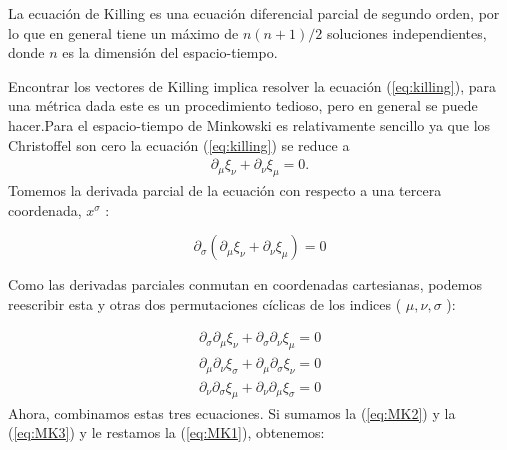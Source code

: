 \begin{note}
    La ecuación de Killing es una ecuación diferencial parcial de segundo orden, por lo que en general tiene un máximo de $n(n+1)/2$ soluciones independientes, donde $n$ es la dimensión del espacio-tiempo.
\end{note}
Encontrar los vectores de Killing implica resolver la ecuación (\ref{eq:killing}), para una métrica dada este es un procedimiento tedioso, pero en general se puede hacer.Para el espacio-tiempo de Minkowski es relativamente sencillo ya que los Christoffel son cero la ecuación (\ref{eq:killing}) se reduce a
\begin{equation}
    \begin{aligned}
        \partial_\mu \xi_\nu + \partial_\nu \xi_\mu =0.
    \end{aligned}
\end{equation}
Tomemos la derivada parcial de la ecuación con respecto a una tercera coordenada, $x^\sigma$ :

\begin{equation}
\partial_\sigma\left(\partial_\mu \xi_\nu+\partial_\nu \xi_\mu\right)=0    
\end{equation}



Como las derivadas parciales conmutan en coordenadas cartesianas, podemos reescribir esta y otras dos permutaciones cíclicas de los indices ( $\mu, \nu, \sigma$ ):

\begin{eqnarray}
    \partial_\sigma \partial_\mu \xi_\nu+\partial_\sigma \partial_\nu \xi_\mu=0 \label{eq:MK1} \\
    \partial_\mu \partial_\nu \xi_\sigma+\partial_\mu \partial_\sigma \xi_\nu=0 \label{eq:MK2} \\
    \partial_\nu \partial_\sigma \xi_\mu+\partial_\nu \partial_\mu \xi_\sigma=0 \label{eq:MK3}
\end{eqnarray}
Ahora, combinamos estas tres ecuaciones. Si sumamos la (\ref{eq:MK2}) y la (\ref{eq:MK3}) y le restamos la (\ref{eq:MK1}), obtenemos:


